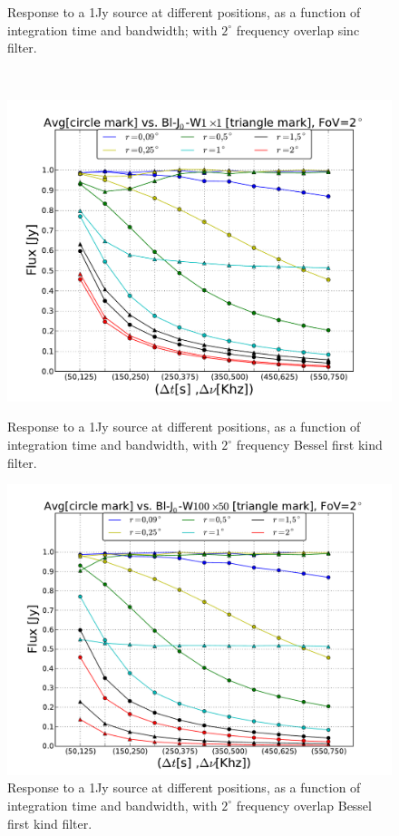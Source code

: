 \documentclass[useAMS,usenatbib]{mn2e}
\begin{document}
\begin{figure}
\begin{minipage}{0.36\linewidth}
    \caption{Response to a 1Jy source at different positions, as a function of integration time and bandwidth; with $2^{\circ}$ frequency 
 overlap sinc filter.}
    \label{fig:max-integ-timefreq-sinc-w100x50-fov2}\end{minipage}\\
\begin{minipage}{0.36\linewidth}\includegraphics[width=1\textwidth]{./Figures/max-integ-timefreq-bessel-w1x1-fov2.pdf}
      \caption{Response to a 1Jy source at different positions, as a function of integration time and bandwidth, with $2^{\circ}$ frequency 
Bessel first kind filter.}
      \label{fig:max-integ-timefreq-bessel-w1x1-fov2}\end{minipage}
\hspace{1cm}
\begin{minipage}{0.36\linewidth}\includegraphics[width=1\textwidth]{./Figures/max-integ-timefreq-bessel-w100x50-fov2.pdf}
      \caption{Response to a 1Jy source at different positions, as a function of integration time and bandwidth, with $2^{\circ}$ frequency 
overlap Bessel first kind filter.}
  \label{fig:max-integ-timefreq-bessel-w100x50-fov2}\end{minipage}
\end{figure}
\bsp
\label{lastpage}
\end{document}
